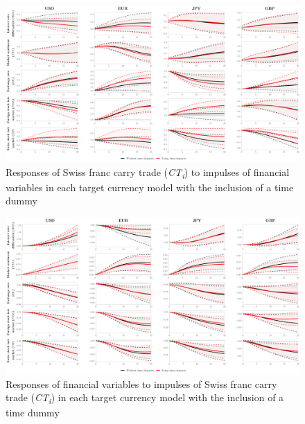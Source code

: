 \documentclass[a4paper, twoside]{templates/ociamthesis}
\begin{document}
\begin{figure}[!ht]

{\centering \includegraphics[width=0.99\columnwidth]{figure/gALL_COIRF20_RESP20_DUMMY} 

}

\caption{Responses of Swiss franc carry trade (\textit{CT\textsubscript{i}}) to impulses of financial variables in each target currency model with the inclusion of a time dummy}\label{fig:FigureD5}
\end{figure}

\begin{figure}[!ht]

{\centering \includegraphics[width=0.99\columnwidth]{figure/gALL_COIRF20_DUMMY} 

}

\caption{Responses of financial variables to impulses of Swiss franc carry trade (\textit{CT\textsubscript{i}}) in each target currency model with the inclusion of a time dummy}\label{fig:FigureD6}
\end{figure}

\clearpage
\end{document}
